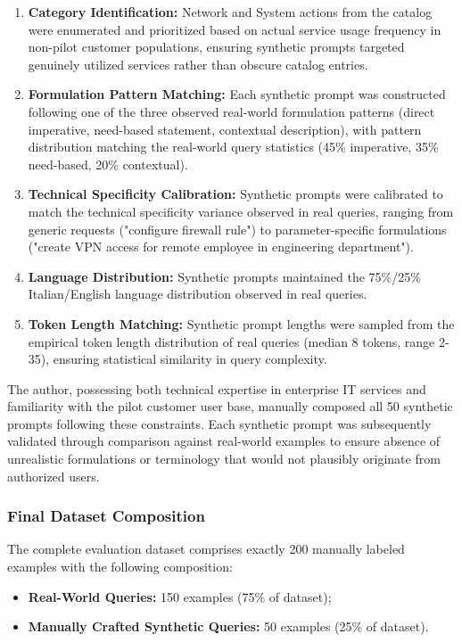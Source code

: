 \begin{enumerate}
    \item \textbf{Category Identification:} Network and System actions from the catalog were enumerated and prioritized based on actual service usage frequency in non-pilot customer populations, ensuring synthetic prompts targeted genuinely utilized services rather than obscure catalog entries.
    \item \textbf{Formulation Pattern Matching:} Each synthetic prompt was constructed following one of the three observed real-world formulation patterns (direct imperative, need-based statement, contextual description), with pattern distribution matching the real-world query statistics (45\% imperative, 35\% need-based, 20\% contextual).
    \item \textbf{Technical Specificity Calibration:} Synthetic prompts were calibrated to match the technical specificity variance observed in real queries, ranging from generic requests ("configure firewall rule") to parameter-specific formulations ("create VPN access for remote employee in engineering department").
    \item \textbf{Language Distribution:} Synthetic prompts maintained the 75\%/25\% Italian/English language distribution observed in real queries.
    \item \textbf{Token Length Matching:} Synthetic prompt lengths were sampled from the empirical token length distribution of real queries (median 8 tokens, range 2-35), ensuring statistical similarity in query complexity.
\end{enumerate}

The author, possessing both technical expertise in enterprise IT services and familiarity with the pilot customer user base, manually composed all 50 synthetic prompts following these constraints. Each synthetic prompt was subsequently validated through comparison against real-world examples to ensure absence of unrealistic formulations or terminology that would not plausibly originate from authorized users.

\subsubsection{Final Dataset Composition}

The complete evaluation dataset comprises exactly 200 manually labeled examples with the following composition:

\begin{itemize}
    \item \textbf{Real-World Queries:} 150 examples (75\% of dataset);
    \item \textbf{Manually Crafted Synthetic Queries:} 50 examples (25\% of dataset).
\end{itemize}

